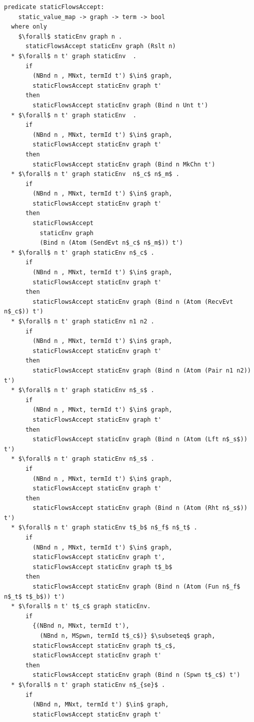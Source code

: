 \documentclass[letterpaper, 11pt]{extarticle}
\begin{document}
\begin{lstlisting}[language=logic, mathescape]
  predicate staticFlowsAccept:
    static_value_map -> graph -> term -> bool
  where only
    $\forall$ staticEnv graph n .
      staticFlowsAccept staticEnv graph (Rslt n)
  * $\forall$ n t' graph staticEnv  .
      if
        (NBnd n , MNxt, termId t') $\in$ graph,
        staticFlowsAccept staticEnv graph t'
      then
        staticFlowsAccept staticEnv graph (Bind n Unt t')
  * $\forall$ n t' graph staticEnv  .
      if
        (NBnd n , MNxt, termId t') $\in$ graph,
        staticFlowsAccept staticEnv graph t'
      then
        staticFlowsAccept staticEnv graph (Bind n MkChn t')
  * $\forall$ n t' graph staticEnv  n$_c$ n$_m$ .
      if
        (NBnd n , MNxt, termId t') $\in$ graph, 
        staticFlowsAccept staticEnv graph t'
      then
        staticFlowsAccept
          staticEnv graph
          (Bind n (Atom (SendEvt n$_c$ n$_m$)) t')
  * $\forall$ n t' graph staticEnv n$_c$ .
      if
        (NBnd n , MNxt, termId t') $\in$ graph,
        staticFlowsAccept staticEnv graph t'
      then
        staticFlowsAccept staticEnv graph (Bind n (Atom (RecvEvt n$_c$)) t')
  * $\forall$ n t' graph staticEnv n1 n2 .
      if
        (NBnd n , MNxt, termId t') $\in$ graph,
        staticFlowsAccept staticEnv graph t'
      then
        staticFlowsAccept staticEnv graph (Bind n (Atom (Pair n1 n2)) t')
  * $\forall$ n t' graph staticEnv n$_s$ .
      if
        (NBnd n , MNxt, termId t') $\in$ graph,
        staticFlowsAccept staticEnv graph t'
      then
        staticFlowsAccept staticEnv graph (Bind n (Atom (Lft n$_s$)) t')
  * $\forall$ n t' graph staticEnv n$_s$ .
      if
        (NBnd n , MNxt, termId t') $\in$ graph,
        staticFlowsAccept staticEnv graph t'
      then
        staticFlowsAccept staticEnv graph (Bind n (Atom (Rht n$_s$)) t')
  * $\forall$ n t' graph staticEnv t$_b$ n$_f$ n$_t$ .
      if
        (NBnd n , MNxt, termId t') $\in$ graph,
        staticFlowsAccept staticEnv graph t', 
        staticFlowsAccept staticEnv graph t$_b$
      then
        staticFlowsAccept staticEnv graph (Bind n (Atom (Fun n$_f$ n$_t$ t$_b$)) t')
  * $\forall$ n t' t$_c$ graph staticEnv.
      if
        {(NBnd n, MNxt, termId t'),
          (NBnd n, MSpwn, termId t$_c$)} $\subseteq$ graph, 
        staticFlowsAccept staticEnv graph t$_c$, 
        staticFlowsAccept staticEnv graph t'
      then
        staticFlowsAccept staticEnv graph (Bind n (Spwn t$_c$) t')
  * $\forall$ n t' graph staticEnv n$_{se}$ .
      if
        (NBnd n, MNxt, termId t') $\in$ graph, 
        staticFlowsAccept staticEnv graph t'

\end{lstlisting}
\end{document}
